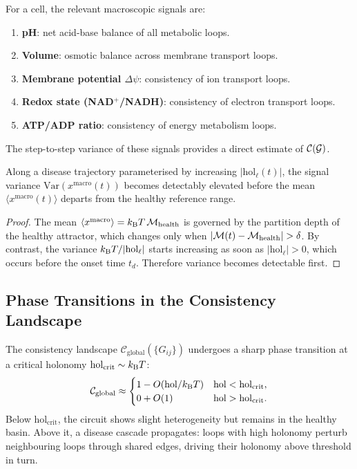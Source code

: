 \begin{corollary}
\label{cor:measurable-signals}
For a cell, the relevant macroscopic signals are:
\begin{enumerate}[label=(\roman*), noitemsep]
  \item \textbf{pH}: net acid-base balance of all metabolic loops.
  \item \textbf{Volume}: osmotic balance across membrane transport loops.
  \item \textbf{Membrane potential $\Delta\psi$}: consistency of ion transport loops.
  \item \textbf{Redox state (NAD$^+$/NADH)}: consistency of electron transport loops.
  \item \textbf{ATP/ADP ratio}: consistency of energy metabolism loops.
\end{enumerate}
The step-to-step variance of these signals provides a direct estimate of
$\mathcal{C}(\mathcal{G})$.
\end{corollary}

\begin{proposition}
\label{prop:variance-precedes}
Along a disease trajectory parameterised by increasing $|\mathrm{hol}_\ell(t)|$,
the signal variance $\mathrm{Var}(x^{\mathrm{macro}}(t))$ becomes
detectably elevated before the mean $\langle x^{\mathrm{macro}}(t)\rangle$
departs from the healthy reference range.
\end{proposition}

\begin{proof}
The mean
$\langle x^{\mathrm{macro}}\rangle = k_{\mathrm{B}} T\,\mathcal{M}_{\mathrm{health}}$
is governed by the partition depth of the healthy attractor, which changes
only when $|\mathcal{M}(t) - \mathcal{M}_{\mathrm{health}}| > \delta$.  By contrast,
the variance $k_{\mathrm{B}} T / |\mathrm{hol}_\ell|$ starts increasing as soon as
$|\mathrm{hol}_\ell| > 0$, which occurs before the onset time $t_d$.
Therefore variance becomes detectable first.
\end{proof}

\subsection{Phase Transitions in the Consistency Landscape}

The consistency landscape $\mathcal{C}_{\mathrm{global}}(\{G_{ij}\})$
undergoes a sharp phase transition at a critical holonomy
$\mathrm{hol}_{\mathrm{crit}} \sim k_{\mathrm{B}} T$:
\begin{equation}
  \mathcal{C}_{\mathrm{global}}
  \approx
  \begin{cases}
    1 - O(\mathrm{hol}/k_{\mathrm{B}} T) & \mathrm{hol} < \mathrm{hol}_{\mathrm{crit}}, \\
    0 + O(1) & \mathrm{hol} > \mathrm{hol}_{\mathrm{crit}}.
  \end{cases}
  \label{eq:consistency-transition}
\end{equation}
Below $\mathrm{hol}_{\mathrm{crit}}$, the circuit shows slight heterogeneity
but remains in the healthy basin.  Above it, a disease cascade propagates:
loops with high holonomy perturb neighbouring loops through shared edges,
driving their holonomy above threshold in turn.

